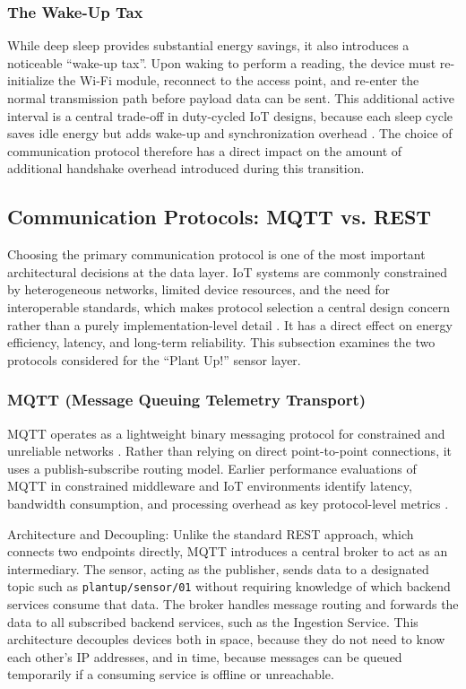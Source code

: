 \subsubsection{The Wake-Up Tax}
While deep sleep provides substantial energy savings, it also introduces a noticeable ``wake-up tax''. Upon waking to perform a reading, the device must re-initialize the Wi-Fi module, reconnect to the access point, and re-enter the normal transmission path before payload data can be sent. This additional active interval is a central trade-off in duty-cycled IoT designs, because each sleep cycle saves idle energy but adds wake-up and synchronization overhead \cite{espIdfS3SleepModes, kozlowskiSosnowskiDutyCycling2019}. The choice of communication protocol therefore has a direct impact on the amount of additional handshake overhead introduced during this transition.

\subsection{Communication Protocols: MQTT vs. REST}
Choosing the primary communication protocol is one of the most important architectural decisions at the data layer. IoT systems are commonly constrained by heterogeneous networks, limited device resources, and the need for interoperable standards, which makes protocol selection a central design concern rather than a purely implementation-level detail \cite{chenKunz2016IotProtocols}. It has a direct effect on energy efficiency, latency, and long-term reliability. This subsection examines the two protocols considered for the ``Plant Up!'' sensor layer.

\subsubsection{MQTT (Message Queuing Telemetry Transport)}
MQTT operates as a lightweight binary messaging protocol for constrained and unreliable networks \cite{oasisMQTT}. Rather than relying on direct point-to-point connections, it uses a publish-subscribe routing model. Earlier performance evaluations of MQTT in constrained middleware and IoT environments identify latency, bandwidth consumption, and processing overhead as key protocol-level metrics \cite{thangavel2014mqttCoap, seoane2021CoapMqttSecurity, yamin2018MqttCoap}.

Architecture and Decoupling:
Unlike the standard REST approach, which connects two endpoints directly, MQTT introduces a central broker to act as an intermediary. The sensor, acting as the publisher, sends data to a designated topic such as \texttt{plantup/sensor/01} without requiring knowledge of which backend services consume that data. The broker handles message routing and forwards the data to all subscribed backend services, such as the Ingestion Service. This architecture decouples devices both in space, because they do not need to know each other's IP addresses, and in time, because messages can be queued temporarily if a consuming service is offline or unreachable.

